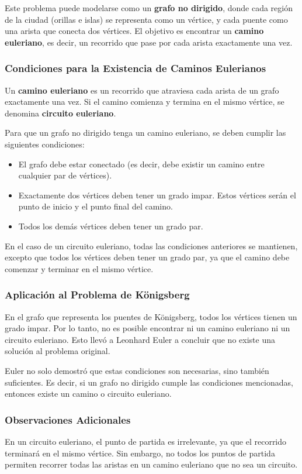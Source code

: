 Este problema puede modelarse como un \textbf{grafo no dirigido}, donde cada región de la ciudad (orillas e islas) se representa como un vértice, y cada puente como una arista que conecta dos vértices. El objetivo es encontrar un \textbf{camino euleriano}, es decir, un recorrido que pase por cada arista exactamente una vez.

\subsubsection{Condiciones para la Existencia de Caminos Eulerianos}
Un \textbf{camino euleriano} es un recorrido que atraviesa cada arista de un grafo exactamente una vez. Si el camino comienza y termina en el mismo vértice, se denomina \textbf{circuito euleriano}.

Para que un grafo no dirigido tenga un camino euleriano, se deben cumplir las siguientes condiciones:
\begin{itemize}
\item El grafo debe estar conectado (es decir, debe existir un camino entre cualquier par de vértices).
\item Exactamente dos vértices deben tener un grado impar. Estos vértices serán el punto de inicio y el punto final del camino.
\item Todos los demás vértices deben tener un grado par.
\end{itemize}

En el caso de un circuito euleriano, todas las condiciones anteriores se mantienen, excepto que todos los vértices deben tener un grado par, ya que el camino debe comenzar y terminar en el mismo vértice.

\subsubsection{Aplicación al Problema de Königsberg}
En el grafo que representa los puentes de Königsberg, todos los vértices tienen un grado impar. Por lo tanto, no es posible encontrar ni un camino euleriano ni un circuito euleriano. Esto llevó a Leonhard Euler a concluir que no existe una solución al problema original.

Euler no solo demostró que estas condiciones son necesarias, sino también suficientes. Es decir, si un grafo no dirigido cumple las condiciones mencionadas, entonces existe un camino o circuito euleriano.

\subsubsection{Observaciones Adicionales}
En un circuito euleriano, el punto de partida es irrelevante, ya que el recorrido terminará en el mismo vértice. Sin embargo, no todos los puntos de partida permiten recorrer todas las aristas en un camino euleriano que no sea un circuito.

